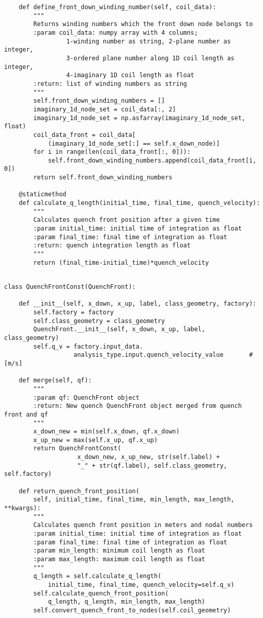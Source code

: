 \begin{verbatim}
    def define_front_down_winding_number(self, coil_data):
        """
        Returns winding numbers which the front down node belongs to
        :param coil_data: numpy array with 4 columns; 
                 1-winding number as string, 2-plane number as integer,
                 3-ordered plane number along 1D coil length as integer, 
                 4-imaginary 1D coil length as float
        :return: list of winding numbers as string
        """
        self.front_down_winding_numbers = []
        imaginary_1d_node_set = coil_data[:, 2]
        imaginary_1d_node_set = np.asfarray(imaginary_1d_node_set, float)
        coil_data_front = coil_data[
            (imaginary_1d_node_set[:] == self.x_down_node)]
        for i in range(len(coil_data_front[:, 0])):
            self.front_down_winding_numbers.append(coil_data_front[i, 0])
        return self.front_down_winding_numbers

    @staticmethod
    def calculate_q_length(initial_time, final_time, quench_velocity):
        """
        Calculates quench front position after a given time
        :param initial_time: initial time of integration as float
        :param final_time: final time of integration as float
        :return: quench integration length as float
        """
        return (final_time-initial_time)*quench_velocity
\end{verbatim}


\begin{verbatim}

class QuenchFrontConst(QuenchFront):

    def __init__(self, x_down, x_up, label, class_geometry, factory):
        self.factory = factory
        self.class_geometry = class_geometry
        QuenchFront.__init__(self, x_down, x_up, label, class_geometry)
        self.q_v = factory.input_data.
                   analysis_type.input.quench_velocity_value       # [m/s]

    def merge(self, qf):
        """
        :param qf: QuenchFront object
        :return: New quench QuenchFront object merged from quench front and qf
        """
        x_down_new = min(self.x_down, qf.x_down)
        x_up_new = max(self.x_up, qf.x_up)
        return QuenchFrontConst(
                    x_down_new, x_up_new, str(self.label) + 
                    "_" + str(qf.label), self.class_geometry, self.factory)

    def return_quench_front_position(
        self, initial_time, final_time, min_length, max_length, **kwargs):
        """
        Calculates quench front position in meters and nodal numbers
        :param initial_time: initial time of integration as float
        :param final_time: final time of integration as float
        :param min_length: minimum coil length as float
        :param max_length: maximum coil length as float
        """
        q_length = self.calculate_q_length(
            initial_time, final_time, quench_velocity=self.q_v)
        self.calculate_quench_front_position(
            q_length, q_length, min_length, max_length)
        self.convert_quench_front_to_nodes(self.coil_geometry)
\end{verbatim}


